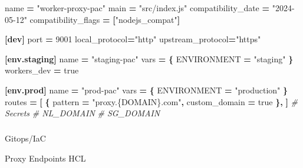 \documentclass[
]{article}
\makeatletter
\let\oldsubparagraph\subparagraph
\renewcommand{\subparagraph}{
    \@ifstar
      \xxxSubParagraphStar
      \xxxSubParagraphNoStar
  }
\newcommand{\xxxSubParagraphStar}[1]{\oldsubparagraph*{#1}\mbox{}}
\newcommand{\xxxSubParagraphNoStar}[1]{\oldsubparagraph{#1}\mbox{}}
\newenvironment{Shaded}{\begin{snugshade}}{\end{snugshade}}
\newcommand{\CommentTok}[1]{\textcolor[rgb]{0.56,0.35,0.01}{\textit{#1}}}
\newcommand{\ConstantTok}[1]{\textcolor[rgb]{0.56,0.35,0.01}{#1}}
\newcommand{\DataTypeTok}[1]{\textcolor[rgb]{0.13,0.29,0.53}{#1}}
\newcommand{\DecValTok}[1]{\textcolor[rgb]{0.00,0.00,0.81}{#1}}
\newcommand{\KeywordTok}[1]{\textcolor[rgb]{0.13,0.29,0.53}{\textbf{#1}}}
\newcommand{\NormalTok}[1]{#1}
\newcommand{\OperatorTok}[1]{\textcolor[rgb]{0.81,0.36,0.00}{\textbf{#1}}}
\newcommand{\SpecialStringTok}[1]{\textcolor[rgb]{0.31,0.60,0.02}{#1}}
\newcommand{\StringTok}[1]{\textcolor[rgb]{0.31,0.60,0.02}{#1}}
\newcommand{\VariableTok}[1]{\textcolor[rgb]{0.00,0.00,0.00}{#1}}
\makeatother
\begin{document}
\begin{Shaded}
\begin{Highlighting}[numbers=left,,]
\DataTypeTok{name} \OperatorTok{=} \StringTok{"worker{-}proxy{-}pac"}
\DataTypeTok{main} \OperatorTok{=} \StringTok{"src/index.js"}
\DataTypeTok{compatibility\_date} \OperatorTok{=} \StringTok{"2024{-}05{-}12"}
\DataTypeTok{compatibility\_flags} \OperatorTok{=} \OperatorTok{[}\StringTok{"nodejs\_compat"}\OperatorTok{]}
 
\KeywordTok{[dev]}
\DataTypeTok{port} \OperatorTok{=} \DecValTok{9001}
\DataTypeTok{local\_protocol}\OperatorTok{=}\StringTok{"http"}
\DataTypeTok{upstream\_protocol}\OperatorTok{=}\StringTok{"https"}
 
\KeywordTok{[env.staging]}
\DataTypeTok{name} \OperatorTok{=} \StringTok{"staging{-}pac"}
\DataTypeTok{vars} \OperatorTok{=} \OperatorTok{\{ }\DataTypeTok{ENVIRONMENT}\OperatorTok{ =} \StringTok{"staging"}\OperatorTok{ \}}
\DataTypeTok{workers\_dev} \OperatorTok{=} \ConstantTok{true}
 
\KeywordTok{[env.prod]}
\DataTypeTok{name} \OperatorTok{=} \StringTok{"prod{-}pac"}
\DataTypeTok{vars} \OperatorTok{=} \OperatorTok{\{ }\DataTypeTok{ENVIRONMENT}\OperatorTok{ =} \StringTok{"production"}\OperatorTok{ \}}
\DataTypeTok{routes} \OperatorTok{=} \OperatorTok{[}
    \OperatorTok{\{ }\DataTypeTok{pattern}\OperatorTok{ =} \StringTok{"proxy.\{DOMAIN\}.com"}\OperatorTok{, }\DataTypeTok{custom\_domain}\OperatorTok{ =} \ConstantTok{true}\OperatorTok{ \},}
\OperatorTok{]}
\CommentTok{\# Secrets}
\CommentTok{\# NL\_DOMAIN}
\CommentTok{\# SG\_DOMAIN}
\end{Highlighting}
\end{Shaded}

\newpage{}

\subparagraph{Gitops/IaC}\label{gitopsiac}

Proxy Endpoints HCL

\begin{Shaded}
\end{Shaded}
\end{document}

